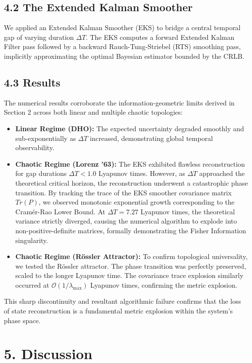 \documentclass[aps,prl,reprint,superscriptaddress,nofootinbib]{revtex4-2}
\begin{document}
\subsection{4.2 The Extended Kalman Smoother}
We applied an Extended Kalman Smoother (EKS) to bridge a central temporal gap of varying duration $\Delta T$. The EKS computes a forward Extended Kalman Filter pass followed by a backward Rauch-Tung-Striebel (RTS) smoothing pass, implicitly approximating the optimal Bayesian estimator bounded by the CRLB.

\subsection{4.3 Results}
The numerical results corroborate the information-geometric limits derived in Section 2 across both linear and multiple chaotic topologies:
\begin{itemize}
    \item \textbf{Linear Regime (DHO):} The expected uncertainty degraded smoothly and sub-exponentially as $\Delta T$ increased, demonstrating global temporal observability.
    \item \textbf{Chaotic Regime (Lorenz '63):} The EKS exhibited flawless reconstruction for gap durations $\Delta T < 1.0$ Lyapunov times. However, as $\Delta T$ approached the theoretical critical horizon, the reconstruction underwent a catastrophic phase transition. By tracking the trace of the EKS smoother covariance matrix $Tr(P)$, we observed monotonic exponential growth corresponding to the Cram\'{e}r-Rao Lower Bound. At $\Delta T = 7.27$ Lyapunov times, the theoretical variance strictly diverged, causing the numerical algorithm to explode into non-positive-definite matrices, formally demonstrating the Fisher Information singularity.
    \item \textbf{Chaotic Regime (R\"{o}ssler Attractor):} To confirm topological universality, we tested the R\"{o}ssler attractor. The phase transition was perfectly preserved, scaled to the longer Lyapunov time. The covariance trace explosion similarly occurred at $\mathcal{O}(1/\lambda_{\max})$ Lyapunov times, confirming the metric explosion.
\end{itemize}

This sharp discontinuity and resultant algorithmic failure confirms that the loss of state reconstruction is a fundamental metric explosion within the system's phase space.

\section{5. Discussion}
\end{document}
